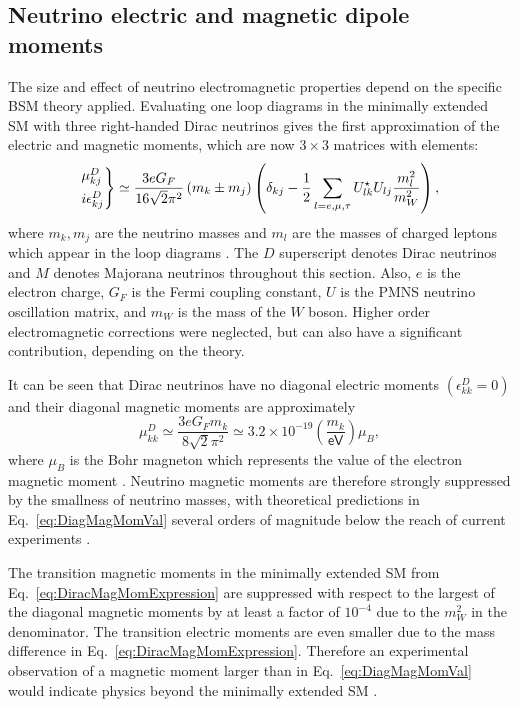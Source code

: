 \subsection{Neutrino electric and magnetic dipole moments}
The size and effect of neutrino electromagnetic properties depend on the specific \gls{BSM} theory applied. Evaluating one loop diagrams in the minimally extended \gls{SM} with three right-handed Dirac neutrinos gives the first approximation of the electric and magnetic moments, which are now $3\times 3$ matrices with elements:
\begin{equation}\label{eq:DiracMagMomExpression}
\begin{rcases}
\mu^D_{kj}\\
i\epsilon^D_{kj}
\end{rcases}
\simeq\frac{3eG_F}{16\sqrt{2}\pi^2}\left(m_k\pm m_j\right)\left(\delta_{kj}-\frac{1}{2}\sum_{l=e,\mu ,\tau}U^{\star}_{lk}U_{lj}\frac{m_l^2}{m_W^2}\right),
\end{equation}
where $m_k,m_j$ are the neutrino masses and $m_l$ are the masses of charged leptons which appear in the loop diagrams \cite{nuElmagInt2015.pdf}. The $D$ superscript denotes Dirac neutrinos and $M$ denotes Majorana neutrinos throughout this section. Also, $e$ is the electron charge, $G_F$ is the Fermi coupling constant, $U$ is the \gls{PMNS} neutrino oscillation matrix, and $m_W$ is the mass of the $W$ boson. Higher order electromagnetic corrections were neglected, but can also have a significant contribution, depending on the theory.

It can be seen that Dirac neutrinos have no diagonal electric moments $\left(\epsilon_{kk}^D=0\right)$ and their diagonal magnetic moments are approximately
\begin{equation}\label{eq:DiagMagMomVal}
\mu_{kk}^D\simeq\frac{3eG_Fm_k}{8\sqrt{2}\pi^2}\simeq 3.2\times 10^{-19}\left(\frac{m_k}{\textsf{eV}}\right)\mu_B,
\end{equation}
where $\mu_B$ is the Bohr magneton which represents the value of the electron magnetic moment \cite{nuElmagInt2015.pdf}. Neutrino magnetic moments are therefore strongly suppressed by the smallness of neutrino masses, with theoretical predictions in Eq.~\ref{eq:DiagMagMomVal} several orders of magnitude below the reach of current experiments \cite{NeutrinoPropertiesSnowmass2022.pdf}.

The transition magnetic moments in the minimally extended \gls{SM} from Eq.~\ref{eq:DiracMagMomExpression} are suppressed with respect to the largest of the diagonal magnetic moments by at least a factor of $10^{-4}$ due to the $m_W^2$ in the denominator. The transition electric moments are even smaller due to the mass difference in Eq.~\ref{eq:DiracMagMomExpression}. Therefore an experimental observation of a magnetic moment larger than in Eq.~\ref{eq:DiagMagMomVal} would indicate physics beyond the minimally extended \gls{SM} \cite{nuElmagInt2015.pdf,nuMMMajoranaBounds2006.pdf}.

